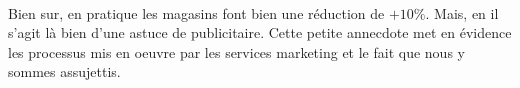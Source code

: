 \documentclass{article}
\begin{document}
\paragraph*{}
Bien sur, en pratique les magasins font bien une réduction de $+10\%$. Mais, en 
il s'agit là bien d'une astuce de publicitaire. 
Cette petite annecdote met en évidence les processus mis en oeuvre par les 
services marketing et le fait que nous y sommes assujettis. 
\end{document}
